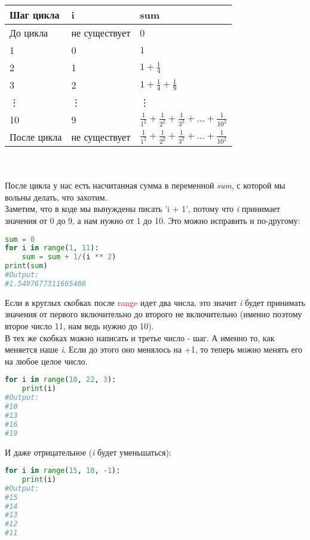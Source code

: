 \documentclass[12pt]{article} %
\begin{document}
\begin{tabular}{ |p{3cm}|p{3cm}|p{3cm}|  }

	\hline
	Шаг цикла & i & sum\\
	\hline
	\hline
	До цикла & не существует & 0\\
	\hline
	1&0&$1$\\
	\hline 
	2&1&$1 + \frac{1}{4}$\\
	\hline
	3&2&$1 + \frac{1}{4} + \frac{1}{9}$\\
	\hline
	\vdots & \vdots & \vdots \\
	\hline
	10 & 9 & $\frac{1}{1^2} + \frac{1}{2^2} + \frac{1}{3^2} + \ldots + \frac{1}{10^2}$\\
	\hline
	После цикла & не существует & $\frac{1}{1^2} + \frac{1}{2^2} + \frac{1}{3^2} + \ldots + \frac{1}{10^2}$\\
	\hline
\end{tabular}\\
\\
После цикла у нас есть насчитанная сумма в переменной \textit{sum}, с которой мы вольны делать, что захотим.\\
Заметим, что в коде мы вынуждены писать 'i + 1', потому что \textit{i} принимает значения от 0 до 9, а нам нужно от 1 до 10. Это можно исправить и по-другому:
\begin{lstlisting}[language=Python]
sum = 0
for i in range(1, 11):
	sum = sum + 1/(i ** 2)
print(sum)
#Output:
#1.5497677311665408
\end{lstlisting}
Если в круглых скобках после \textcolor{red}{range} идет два числа, это значит \textit{i} будет принимать значения от первого включительно до второго не включительно (именно поэтому второе число 11, нам ведь нужно до 10).\\
В тех же скобках можно написать и третье число - шаг. А именно то, как меняется наше \textit{i}. Если до этого оно менялось на +1, то теперь можно менять его на любое целое число.\\
\begin{lstlisting}[language=Python]
for i in range(10, 22, 3):
	print(i)
#Output:
#10
#13
#16
#19
\end{lstlisting}
И даже отрицательное (\textit{i} будет уменьшаться):
\begin{lstlisting}[language=Python]
for i in range(15, 10, -1):
	print(i)
#Output:
#15
#14
#13
#12
#11
\end{lstlisting}
\end{document}
